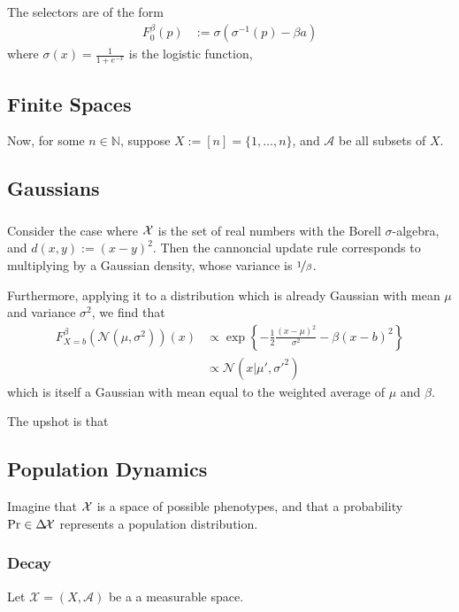 \documentclass{article}
\begin{document}
The selectors are of the form
\begin{align*}
    F_0^\beta(p) &:= \sigma( \sigma^{-1}(p) - \beta a)
\end{align*}
where $\sigma(x) = \frac{1}{1 + e^{-x}}$ is the logistic function,

\subsection{Finite Spaces}
Now, for some $n \in \mathbb N$, suppose $X := [n] = \{1, \ldots, n\}$, and $\mathcal A$ be all subsets of $X$.

\subsection{Gaussians}
\subsubsection{}
Consider the case where $\mathcal X$ is the set of real numbers with the Borell $\sigma$-algebra, and $d(x,y) := (x-y)^2$.
Then the cannoncial update rule corresponds to multiplying by a Gaussian density, whose variance is $\nicefrac1\beta$.

Furthermore, applying it to a distribution which is already Gaussian with mean $\mu$ and variance $\sigma^2$, we find that
\begin{align*}
    F^{\beta}_{X=b}(\mathcal N(\mu, \sigma^2))(x) &\propto
        \exp\left\{ - \frac12 \frac{(x-\mu)^2}{ \sigma^2 } - \beta(x-b)^2\right\}
    \\&\propto \mathcal N(x| \mu', \sigma'^2)
\end{align*}
which is itself a Gaussian with mean equal to the weighted average of $\mu$ and $\beta$.

The upshot is that

\subsection{Population Dynamics}
Imagine that $\mathcal X$ is a space of possible phenotypes, and that a probability $\Pr \in \Delta\!\mathcal X$ represents a population distribution.

\subsubsection{Decay}
Let $\mathcal X = (X, \mathcal A)$ be a a measurable space.

\end{document}
